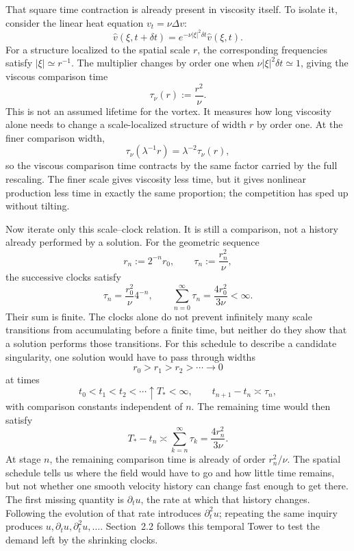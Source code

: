 
That square time contraction is already present in viscosity itself.
To isolate it, consider the linear heat equation \(v_t=\nu\Delta v\):
\[
  \widehat v(\xi,t+\delta t)
  =
  e^{-\nu|\xi|^2\delta t}\widehat v(\xi,t).
\]
For a structure localized to the spatial scale \(r\), the corresponding frequencies satisfy \(|\xi|\simeq r^{-1}\).
The multiplier changes by order one when \(\nu|\xi|^2\delta t\simeq1\), giving the viscous comparison time
\[
  \tau_\nu(r)
  :=
  \frac{r^2}{\nu}.
\]
This is not an assumed lifetime for the vortex.
It measures how long viscosity alone needs to change a scale-localized structure of width \(r\) by order one.
At the finer comparison width,
\[
  \tau_\nu(\lambda^{-1}r)
  =
  \lambda^{-2}\tau_\nu(r),
\]
so the viscous comparison time contracts by the same factor carried by the full \NavierStokes{} rescaling.
The finer scale gives viscosity less time, but it gives nonlinear production less time in exactly the same proportion; the competition has sped up without tilting.


Now iterate only this scale--clock relation.
It is still a comparison, not a history already performed by a solution.
For the geometric sequence
\[
  r_n:=2^{-n}r_0,
  \qquad
  \tau_n:=\frac{r_n^2}{\nu},
\]
the successive clocks satisfy
\[
  \tau_n
  =
  \frac{r_0^2}{\nu}4^{-n},
  \qquad
  \sum_{n=0}^{\infty}\tau_n
  =
  \frac{4r_0^2}{3\nu}
  <
  \infty.
\]
Their sum is finite.
The clocks alone do not prevent infinitely many scale transitions from accumulating before a finite time, but neither do they show that a \NavierStokes{} solution performs those transitions.
For this schedule to describe a candidate singularity, one solution would have to pass through widths
\[
  r_0>r_1>r_2>\cdots\longrightarrow0
\]
at times
\[
  t_0<t_1<t_2<\cdots\uparrow T_*<\infty,
  \qquad
  t_{n+1}-t_n\asymp\tau_n,
\]
with comparison constants independent of \(n\).
The remaining time would then satisfy
\[
  T_*-t_n
  \asymp
  \sum_{k=n}^{\infty}\tau_k
  =
  \frac{4r_n^2}{3\nu}.
\]
At stage \(n\), the remaining comparison time is already of order \(r_n^2/\nu\).
The spatial schedule tells us where the field would have to go and how little time remains, but not whether one smooth velocity history can change fast enough to get there.
The first missing quantity is \(\partial_tu\), the rate at which that history changes.
Following the evolution of that rate introduces \(\partial_t^2u\); repeating the same inquiry produces \(u,\partial_tu,\partial_t^2u,\ldots\).
Section~2.2 follows this temporal Tower to test the demand left by the shrinking clocks.

